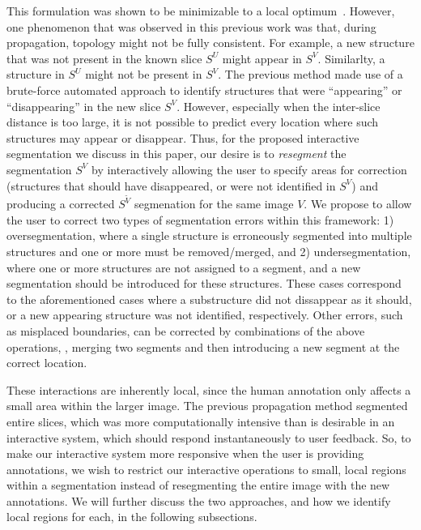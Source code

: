 \documentclass[]{spie}  %
\begin{document}
This formulation was shown to be minimizable to a local
optimum~\cite{veksler:99, boykov:01}.  However, one phenomenon that
was observed in this previous work was that, during propagation,
topology might not be fully consistent.  For example, a new structure
that was not present in the known slice $S^U$ might appear in $S^V$.
Similarlty, a structure in $S^U$ might not be present in $S^V$.  The
previous method made use of a brute-force automated approach to
identify structures that were ``appearing'' or ``disappearing'' in the
new slice $S^V$.  However, especially when the inter-slice distance is
too large, it is not possible to predict every location where such
structures may appear or disappear.  Thus, for the proposed
interactive segmentation we discuss in this paper, our desire is to
\emph{resegment} the segmentation $S^V$ by interactively allowing the
user to specify areas for correction (\ie structures that should have
disappeared, or were not identified in $S^V$) and producing a
corrected $S^{\tilde{V}}$ segmenation for the same image $V$.  We
propose to allow the user to correct two types of segmentation errors
within this framework: 1) oversegmentation, where a single structure
is erroneously segmented into multiple structures and one or more must
be removed/merged, and 2) undersegmentation, where one or more
structures are not assigned to a segment, and a new segmentation
should be introduced for these structures.  These cases correspond to
the aforementioned cases where a substructure did not dissappear as it
should, or a new appearing structure was not identified, respectively.
Other errors, such as misplaced boundaries, can be corrected by
combinations of the above operations, \eg, merging two segments and
then introducing a new segment at the correct location.

These interactions are inherently local, since the human annotation
only affects a small area within the larger image.  The previous
propagation method segmented entire slices, which was more
computationally intensive than is desirable in an interactive system,
which should respond instantaneously to user feedback.  So, to make
our interactive system more responsive when the user is providing
annotations, we wish to restrict our interactive operations to small,
local regions within a segmentation instead of resegmenting the entire
image with the new annotations.  We will further discuss the two
approaches, and how we identify local regions for each, in the
following subsections.

\end{document}
